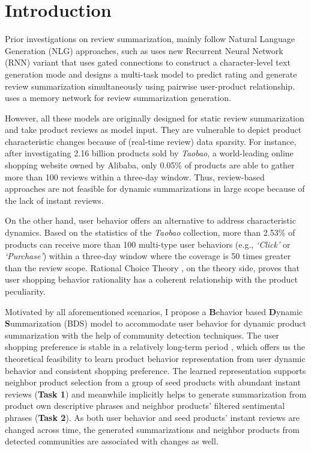 \section{Introduction}

Prior investigations on review summarization, mainly follow Natural Language Generation (NLG) approaches, such as \cite{sutskever2011generating} uses new Recurrent Neural Network (RNN) variant that uses gated connections to construct a character-level text generation mode and \cite{li2017neural} designs a multi-task model to predict rating and generate review summarization simultaneously using pairwise user-product relationship.  \cite{wang2017opinion} uses a memory network for review summarization generation.

However, all these models are originally designed for static review summarization and take product reviews as model input. They are vulnerable to depict product characteristic changes because of (real-time review) data sparsity. For instance, after investigating 2.16 billion products sold by \textit{Taobao}, a world-leading online shopping website owned by Alibaba, only 0.05\% of products are able to gather more than 100 reviews within a three-day window. Thus, review-based approaches are not feasible for dynamic summarizations in large scope because of the lack of instant reviews. 

On the other hand, user behavior offers an alternative to address characteristic dynamics. Based on the statistics of the \textit{Taobao} collection, more than 2.53\% of products can receive more than 100 multi-type user behaviors (e.g., \textit{`Click'} or \textit{`Purchase'}) within a three-day window where the coverage is 50 times greater than the review scope. Rational Choice Theory \cite{blume2008rationality}, on the theory side, proves that user shopping behavior rationality has a coherent relationship with the product peculiarity. 

Motivated by all aforementioned scenarios, I propose a  \textbf{B}ehavior based \textbf{D}ynamic \textbf{S}ummarization (BDS) model to accommodate user behavior for dynamic product summarization with the help of community detection techniques. The user shopping preference is stable in a relatively long-term period \cite{brouwer2017choice}, which offers us the theoretical feasibility to learn product behavior representation from user dynamic behavior and consistent shopping preference. The learned representation supports neighbor product selection from a group of seed products with abundant instant reviews (\textbf{Task 1}) and meanwhile implicitly helps to generate summarization from product own descriptive phrases and neighbor products' filtered sentimental phrases (\textbf{Task 2}). As both user behavior and seed products' instant reviews are changed across time, the generated summarizations and neighbor products from detected communities are associated with changes as well. 

